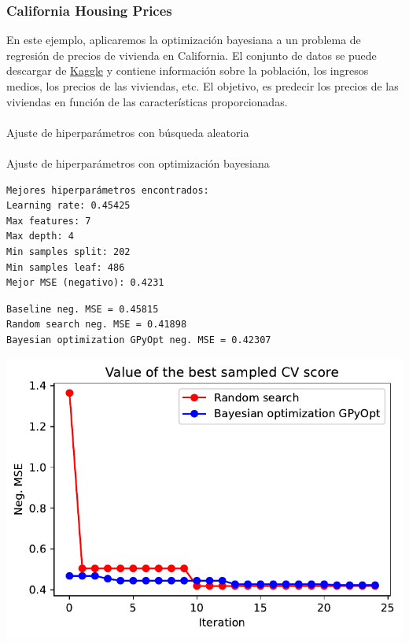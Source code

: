 \documentclass[
  12pt,
  letterpaper,
  DIV=11,
  numbers=noendperiod]{scrartcl}
\makeatletter
\let\oldparagraph\paragraph
\renewcommand{\paragraph}{
    \@ifstar
      \xxxParagraphStar
      \xxxParagraphNoStar
  }
\newcommand{\xxxParagraphStar}[1]{\oldparagraph*{#1}\mbox{}}
\newcommand{\xxxParagraphNoStar}[1]{\oldparagraph{#1}\mbox{}}
\makeatother
\begin{document}
\subsubsection{California Housing
Prices}\label{california-housing-prices}

En este ejemplo, aplicaremos la optimización bayesiana a un problema de
regresión de precios de vivienda en California. El conjunto de datos se
puede descargar de
\href{https://www.kaggle.com/camnugent/california-housing-prices}{Kaggle}
y contiene información sobre la población, los ingresos medios, los
precios de las viviendas, etc. El objetivo, es predecir los precios de
las viviendas en función de las características proporcionadas.

\paragraph{Ajuste de hiperparámetros con búsqueda
aleatoria}\label{ajuste-de-hiperparuxe1metros-con-buxfasqueda-aleatoria-1}

\paragraph{Ajuste de hiperparámetros con optimización
bayesiana}\label{ajuste-de-hiperparuxe1metros-con-optimizaciuxf3n-bayesiana-1}

\begin{verbatim}
Mejores hiperparámetros encontrados:
Learning rate: 0.45425
Max features: 7
Max depth: 4
Min samples split: 202
Min samples leaf: 486
Mejor MSE (negativo): 0.4231
\end{verbatim}

\begin{verbatim}
Baseline neg. MSE = 0.45815
Random search neg. MSE = 0.41898
Bayesian optimization GPyOpt neg. MSE = 0.42307
\end{verbatim}

\includegraphics{ProyFinal_OptBayesiana_2024_files/figure-pdf/cell-22-output-2.pdf}
\end{document}

